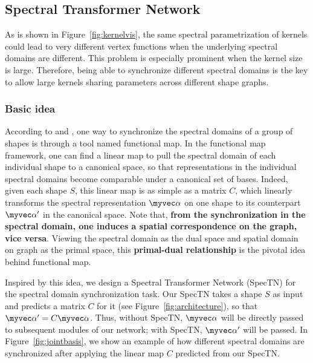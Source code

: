 \subsection{Spectral Transformer Network}
\label{spectn}
As is shown in Figure~\ref{fig:kernelvis}, the same spectral parametrization of kernels could lead to very different vertex functions when the underlying spectral domains are different. This problem is especially prominent when the kernel size is large. Therefore, being able to synchronize different spectral domains is the key to allow large kernels sharing parameters across different shape graphs. 

\subsubsection{Basic idea} According to \cite{ovsjanikov2012functional} and \cite{wang2013image}, one way to synchronize the spectral domains of a group of shapes is through a tool named functional map. In the functional map framework, one can find a linear map to pull the spectral domain of each individual shape to a canonical space, so that representations in the individual spectral domains become comparable under a canonical set of bases. Indeed, given each shape $S$, this linear map is as simple as a matrix $C$, which linearly transforms the spectral representation $\myvec \alpha$ on one shape to its counterpart $\myvec \alpha'$ in the canonical space. Note that, {\bf from the synchronization in the spectral domain, one induces a spatial correspondence on the graph, vice versa}. Viewing the spectral domain as the dual space and spatial domain on graph as the primal space, this {\bf primal-dual relationship} is the pivotal idea behind functional map.

Inspired by this idea, we design a Spectral Transformer Network (SpecTN) for the spectral domain synchronization task. Our SpecTN takes a shape $S$ as input and predicts a matrix $C$ for it (see Figure~\ref{fig:architecture}), so that
$\myvec \alpha'=C \myvec \alpha$.
Thus, without SpecTN, $\myvec \alpha$ will be directly passed to subsequent modules of our network; with SpecTN, $\myvec \alpha'$ will be passed. In Figure~\ref{fig:jointbasis}, we show an example of how different spectral domains are synchronized after applying the linear map $C$ predicted from our SpecTN.

